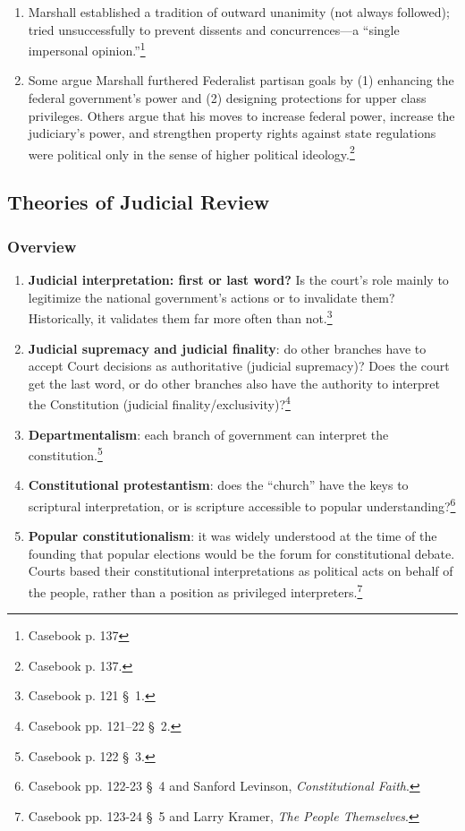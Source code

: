 \begin{enumerate}
\begin{enumerate}
    \item Marshall established a tradition of outward unanimity (not always 
    followed); tried unsuccessfully to prevent dissents and concurrences---a 
    ``single impersonal opinion.''\footnote{Casebook p. 137}
    \item Some argue Marshall furthered Federalist partisan goals by (1) 
    enhancing the federal government's power and (2) designing protections for 
    upper class privileges. Others argue that his moves to increase federal 
    power, increase the judiciary's power, and strengthen property rights 
    against state regulations were political only in the sense of higher 
    political ideology.\footnote{Casebook p. 137.}
\end{enumerate}

\subsection{Theories of Judicial Review}

\subsubsection{Overview}

\begin{enumerate}
    \item \textbf{Judicial interpretation: first or last word?} Is the court's 
    role mainly to legitimize the national government's actions or to 
    invalidate them? Historically, it validates them far more often than 
    not.\footnote{Casebook p. 121 \S\ 1.}
    \item \textbf{Judicial supremacy and judicial finality}: do other branches 
    have to accept Court decisions as authoritative (judicial supremacy)? Does 
    the court get the last word, or do other branches also have the authority 
    to interpret the Constitution (judicial 
    finality/exclusivity)?\footnote{Casebook pp. 121--22 \S\ 2.}
    \item \textbf{Departmentalism}: each branch of government can interpret 
    the constitution.\footnote{Casebook p. 122 \S\ 3.}
    \item \textbf{Constitutional protestantism}: does the ``church'' have the 
    keys to scriptural interpretation, or is scripture accessible to popular 
    understanding?\footnote{Casebook pp. 122-23 \S\ 4 and Sanford Levinson, 
    \emph{Constitutional Faith}.}
    \item \textbf{Popular constitutionalism}: it was widely understood at the 
    time of the founding that popular elections would be the forum for 
    constitutional debate. Courts based their constitutional interpretations 
    as political acts on behalf of the people, rather than a position as 
    privileged interpreters.\footnote{Casebook pp. 123-24 \S\ 5 and Larry 
    Kramer, \emph{The People Themselves}.}
\end{enumerate}


\end{enumerate}

